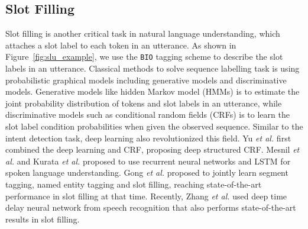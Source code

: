 \documentclass[11pt]{article}
\begin{document}
\subsection{Slot Filling}
Slot filling is another critical task in natural language understanding, which attaches a slot label to each token in an utterance. As shown in  Figure~\ref{fig:slu_example}, we use the \texttt{BIO} tagging scheme to describe the slot labels in an utterance. Classical methods to solve sequence labelling task is using probabilistic graphical models including generative models and discriminative models. Generative models \cite{wang2005spoken} like hidden Markov model (HMMs) is to estimate the joint probability distribution of tokens and slot labels in an utterance, while discriminative models such as conditional random fields (CRFs)\cite{DBLP:conf/iccv/0001JRVSDHT15} is to learn the slot label condition probabilities when given the observed sequence. Similar to the 
intent detection task, deep learning also revolutionized this field. Yu \textit{et al.}\cite{DBLP:journals/jstsp/YuWD10} first combined the deep learning and CRF, proposing deep structured CRF. Mesnil \textit{et al.}\cite{DBLP:conf/interspeech/MesnilHDB13} and Kurata \textit{et al.} \cite{DBLP:conf/emnlp/KurataXZY16} proposed to use recurrent neural networks and LSTM for spoken language understanding. Gong \textit{et al.} \cite{DBLP:conf/aaai/GongLZOLZZDC19} proposed to jointly learn segment tagging, named entity tagging and slot filling, reaching state-of-the-art performance in slot filling at that time. Recently, Zhang \textit{et al.} \cite{DBLP:journals/symmetry/ZhangHW20} used deep time delay neural network from speech recognition that also performs state-of-the-art results in slot filling.
\end{document}
